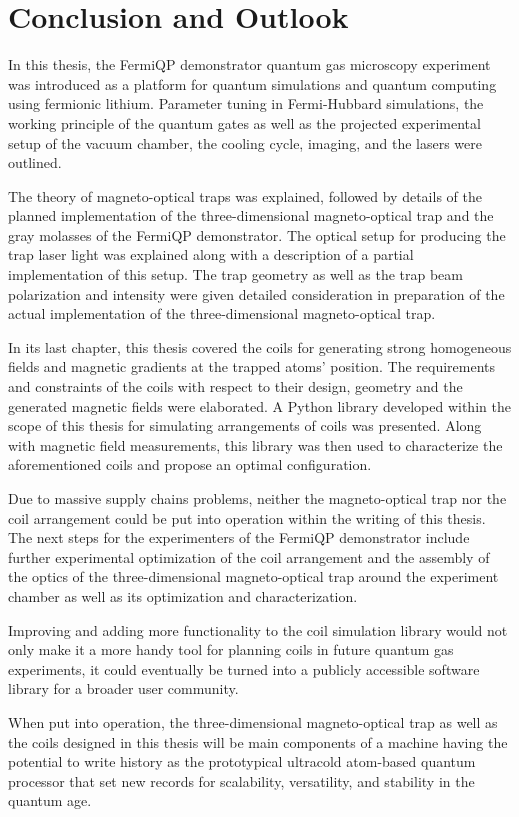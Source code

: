 \renewcommand{\imagepath}{../50-outro/img}

\chapter{Conclusion and Outlook}
In this thesis, the FermiQP demonstrator quantum gas microscopy experiment was introduced as a platform for quantum simulations and quantum computing using fermionic lithium. Parameter tuning in Fermi-Hubbard simulations, the working principle of the quantum gates as well as the projected experimental setup of the vacuum chamber, the cooling cycle, imaging, and the lasers were outlined.

The theory of magneto-optical traps was explained, followed by details of the planned implementation of the three-dimensional magneto-optical trap and the gray molasses of the FermiQP demonstrator. The optical setup for producing the trap laser light was explained along with a description of a partial implementation of this setup. The trap geometry as well as the trap beam polarization and intensity were given detailed consideration in preparation of the actual implementation of the three-dimensional magneto-optical trap.

In its last chapter, this thesis covered the coils for generating strong homogeneous fields and magnetic gradients at the trapped atoms' position. The requirements and constraints of the coils with respect to their design, geometry and the generated magnetic fields were elaborated. A Python library developed within the scope of this thesis  for simulating arrangements of coils was presented. Along with magnetic field measurements, this library was then used to characterize the aforementioned coils and propose an optimal configuration.

Due to massive supply chains problems, neither the magneto-optical trap nor the coil arrangement could be put into operation within the writing of this thesis. The next steps for the experimenters of the FermiQP demonstrator include further experimental optimization of the coil arrangement and the assembly of the optics of the three-dimensional magneto-optical trap around the experiment chamber as well as its optimization and  characterization.

Improving and adding more functionality to the coil simulation library would not only make it a more handy tool for planning coils in future quantum gas experiments, it could eventually be turned into a publicly accessible software library for a broader user community.

When put into operation, the three-dimensional magneto-optical trap as well as the coils designed in this thesis will be main components of a machine having the potential to write history as the prototypical ultracold atom-based quantum processor that set new records for scalability, versatility, and stability in the quantum age.